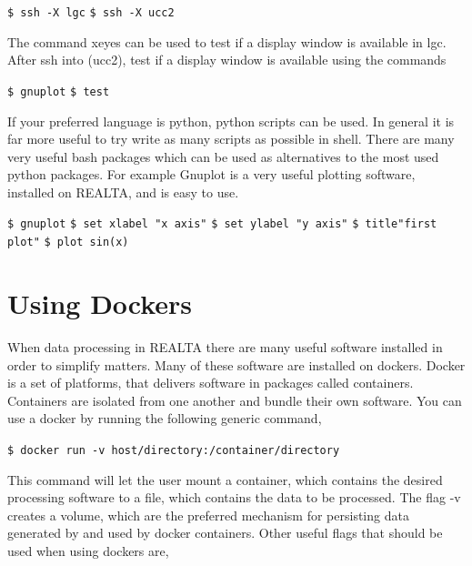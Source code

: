 \documentclass[11pt,fleqn]{book} %
\begin{document}
\verb|$ ssh -X lgc|
\bigbreak{}
\verb|$ ssh -X ucc2|

\vspace{3mm}

The command xeyes can be used to test if a display window is available in lgc. After ssh into (ucc2), test if a display window is available using the commands

\vspace{3mm}

\verb|$ gnuplot|
\bigbreak{}
\verb|$ test|

\vspace{3mm}

If your preferred language is python, python scripts can be used. In general it is far more useful to try write as many scripts as possible in shell. There are many very useful bash packages which can be used as alternatives to the most used python packages. For example Gnuplot is a very useful plotting software, installed on REALTA, and is easy to use.

\vspace{3mm}

\verb|$ gnuplot|
\bigbreak{}
\verb|$ set xlabel "x axis"|
\bigbreak{}
\verb|$ set ylabel "y axis"|
\bigbreak{}
\verb|$ title"first plot"|
\bigbreak{}
\verb|$ plot sin(x)|
\vspace{3mm}



\section{Using Dockers}
When data processing in REALTA there are many useful software installed in order to simplify matters. Many of these software are installed on dockers. Docker is a set of platforms, that delivers software in packages called containers. Containers are isolated from one another and bundle their own software. You can use a docker by running the following generic command,

\vspace{3mm}

\verb|$ docker run -v host/directory:/container/directory|

\vspace{3mm}


This command will let the user mount a container, which contains the desired processing software to a file, which contains the data to be processed. The flag -v creates a volume, which are the preferred mechanism for persisting data generated by and used by docker containers. Other useful flags that should be used when using dockers are,
\end{document}
